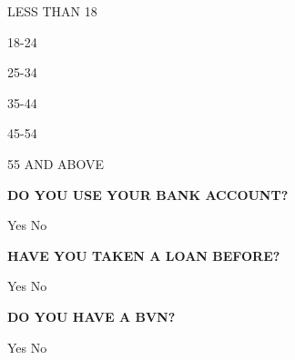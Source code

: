 \documentclass[a4paper]{sdapsclassic}
\begin{document}
\begin{questionnaire}
\begin{enumerate*}
\item[{\small LESS THAN 18} \mycheckbox{}{}] 
\item[{\normalsize 18-24}\mycheckbox{}{}]
\item[{\normalsize 25-34}\mycheckbox{}{}]
\item[{\normalsize 35-44}\mycheckbox{}{}]
\item[{\normalsize 45-54}\mycheckbox{}{}]
\item[{\small 55 AND ABOVE} \mycheckbox{}{}] 
\end{enumerate*}
\vspace{2ex}
\par\begin{minipage}{10em}
\small{\textbf{{\textrm{DO YOU USE YOUR BANK ACCOUNT? }}}}
\end{minipage}\hspace{1ex}\begin{minipage}{3em}\scriptsize Yes\hspace{1ex}\mycheckbox{}{} \scriptsize\hspace{1ex}No \hspace{1ex}\mycheckbox{}{} 
\end{minipage}
\begin{minipage}{9em}
\small{\textbf{{HAVE YOU TAKEN A LOAN BEFORE? }}}
\end{minipage}\hspace{1ex}\begin{minipage}{3em}\scriptsize Yes\hspace{1ex}\mycheckbox{}{} \scriptsize \hspace{1ex}No \hspace{1ex}\mycheckbox{}{} 
\end{minipage}
\begin{minipage}{7em}\small{\textbf{DO YOU HAVE A BVN?}}\end{minipage}
\hspace{1ex}\begin{minipage}{3em}\scriptsize Yes\hspace{1ex}\mycheckbox{}{} \scriptsize \hspace{1ex}No \hspace{1ex}\mycheckbox{}{} 
\end{minipage}
\end{questionnaire}
\end{document}
